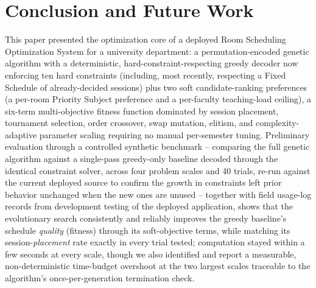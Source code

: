 \documentclass[conference]{IEEEtran}
\begin{document}
\section{Conclusion and Future Work}

This paper presented the optimization core of a deployed Room Scheduling Optimization System for a university department: a permutation-encoded genetic algorithm with a deterministic, hard-constraint-respecting greedy decoder now enforcing ten hard constraints (including, most recently, respecting a Fixed Schedule of already-decided sessions) plus two soft candidate-ranking preferences (a per-room Priority Subject preference and a per-faculty teaching-load ceiling), a six-term multi-objective fitness function dominated by session placement, tournament selection, order crossover, swap mutation, elitism, and complexity-adaptive parameter scaling requiring no manual per-semester tuning. Preliminary evaluation through a controlled synthetic benchmark -- comparing the full genetic algorithm against a single-pass greedy-only baseline decoded through the identical constraint solver, across four problem scales and 40 trials, re-run against the current deployed source to confirm the growth in constraints left prior behavior unchanged when the new ones are unused -- together with field usage-log records from development testing of the deployed application, shows that the evolutionary search consistently and reliably improves the greedy baseline's schedule \emph{quality} (fitness) through its soft-objective terms, while matching its session-\emph{placement} rate exactly in every trial tested; computation stayed within a few seconds at every scale, though we also identified and report a measurable, non-deterministic time-budget overshoot at the two largest scales traceable to the algorithm's once-per-generation termination check.
\end{document}
